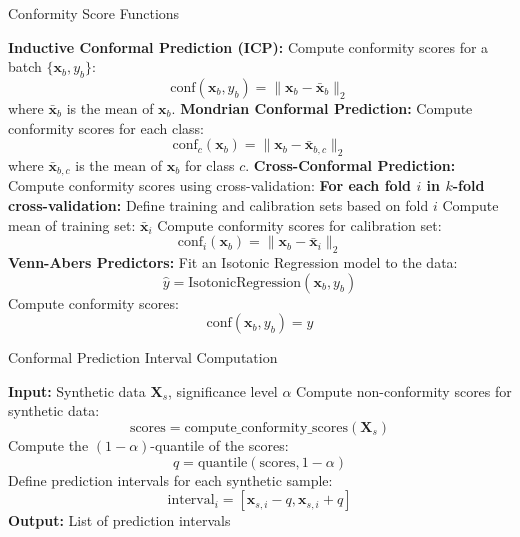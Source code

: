 \documentclass{article}
\begin{document}
\begin{algorithm}[ht]
\caption{Conformity Score Functions}
\begin{algorithmic}[1]
\STATE \textbf{Inductive Conformal Prediction (ICP):}
\STATE Compute conformity scores for a batch $\{ \mathbf{x}_b, y_b \}$:
\[
\text{conf}(\mathbf{x}_b, y_b) = \| \mathbf{x}_b - \bar{\mathbf{x}}_b \|_2
\]
where $\bar{\mathbf{x}}_b$ is the mean of $\mathbf{x}_b$.
\STATE \textbf{Mondrian Conformal Prediction:}
\STATE Compute conformity scores for each class:
\[
\text{conf}_c(\mathbf{x}_b) = \| \mathbf{x}_b - \bar{\mathbf{x}}_{b,c} \|_2
\]
where $\bar{\mathbf{x}}_{b,c}$ is the mean of $\mathbf{x}_b$ for class $c$.
\STATE \textbf{Cross-Conformal Prediction:}
\STATE Compute conformity scores using cross-validation:
\STATE \textbf{For each fold $i$ in $k$-fold cross-validation:}
\STATE \quad Define training and calibration sets based on fold $i$
\STATE \quad Compute mean of training set: $\bar{\mathbf{x}}_i$
\STATE \quad Compute conformity scores for calibration set:
\[
\text{conf}_i(\mathbf{x}_b) = \| \mathbf{x}_b - \bar{\mathbf{x}}_i \|_2
\]
\STATE \textbf{Venn-Abers Predictors:}
\STATE Fit an Isotonic Regression model to the data:
\[
\hat{y} = \text{IsotonicRegression}(\mathbf{x}_b, y_b)
\]
\STATE Compute conformity scores:
\[
\text{conf}(\mathbf{x}_b, y_b) = \hat{y}
\]
\end{algorithmic}
\end{algorithm}


\begin{algorithm}[ht]
\caption{Conformal Prediction Interval Computation}
\begin{algorithmic}[1]
\STATE \textbf{Input:} Synthetic data $\mathbf{X}_s$, significance level $\alpha$
\STATE Compute non-conformity scores for synthetic data:
\[
\text{scores} = \text{compute\_conformity\_scores}(\mathbf{X}_s)
\]
\STATE Compute the $(1 - \alpha)$-quantile of the scores:
\[
q = \text{quantile}(\text{scores}, 1 - \alpha)
\]
\STATE Define prediction intervals for each synthetic sample:
\[
\text{interval}_i = [ \mathbf{x}_{s,i} - q, \mathbf{x}_{s,i} + q ]
\]
\STATE \textbf{Output:} List of prediction intervals
\end{algorithmic}
\end{algorithm}
\end{document}
